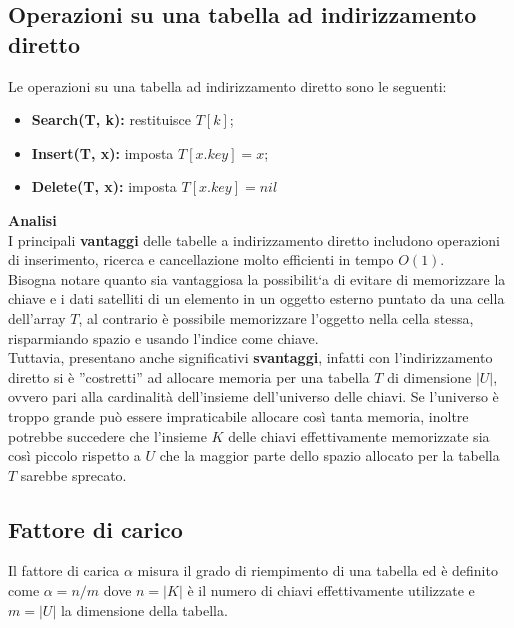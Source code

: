 \subsection{Operazioni su una tabella ad indirizzamento diretto} 
Le operazioni su una tabella ad indirizzamento diretto sono le seguenti:
\begin{itemize}
    \item \textbf{Search(T, k):} restituisce $T[k]$;
    \item \textbf{Insert(T, x):} imposta $T[x.key]=x$;
    \item \textbf{Delete(T, x):} imposta $T[x.key]=nil$
\end{itemize}
\textbf{Analisi}\\
I principali \textbf{vantaggi} delle tabelle a indirizzamento diretto includono operazioni di inserimento,
ricerca e cancellazione molto efficienti in tempo $O(1)$.\\
Bisogna notare quanto sia vantaggiosa la possibilit`a di evitare di memorizzare la chiave e i
dati satelliti di un elemento in un oggetto esterno puntato da una cella dell’array $T$, al contrario
è possibile memorizzare l’oggetto nella cella stessa, risparmiando spazio e usando l’indice come
chiave.\\
Tuttavia, presentano anche significativi \textbf{svantaggi}, infatti con l’indirizzamento diretto si è
”costretti” ad allocare memoria per una tabella $T$ di dimensione $|U|$, ovvero pari alla cardinalità
dell’insieme dell’universo delle chiavi. Se l’universo è troppo grande può essere impraticabile
allocare così tanta memoria, inoltre potrebbe succedere che l’insieme $K$ delle chiavi effettivamente 
memorizzate sia così piccolo rispetto a $U$ che la maggior parte dello spazio allocato per
la tabella $T$ sarebbe sprecato.
\subsection{Fattore di carico}
Il fattore di carica $\alpha$ misura il grado di riempimento di una tabella ed è definito come $\alpha= n/m$
dove $n = |K|$ è il numero di chiavi effettivamente utilizzate e $m = |U|$ la dimensione della
tabella.

